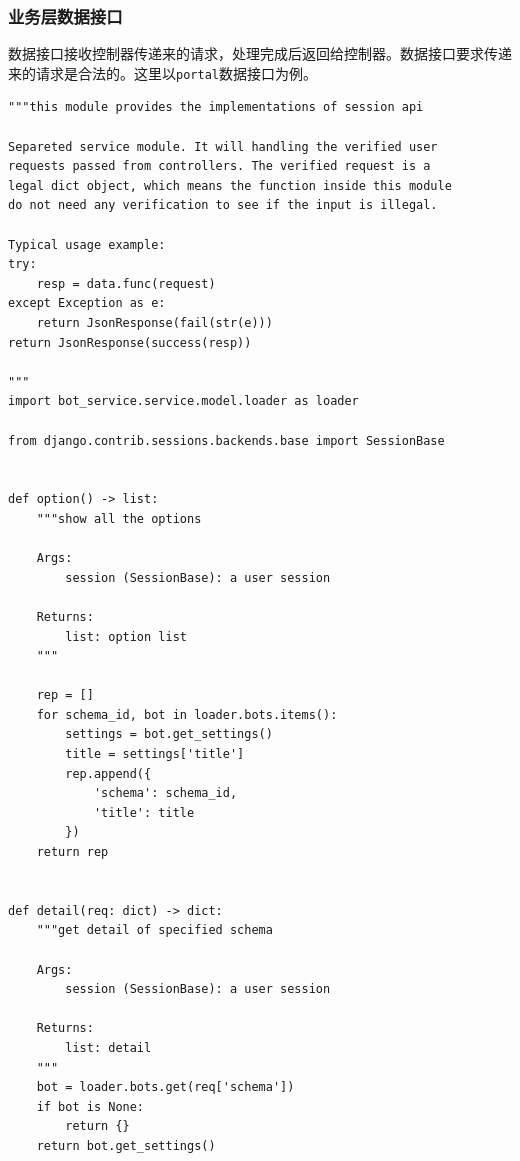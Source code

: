 \documentclass[hyperref]{ctexart}
\begin{document}
\subsubsection{业务层数据接口}
数据接口接收控制器传递来的请求，处理完成后返回给控制器。数据接口要求传递来的请求是合法的。这里以\texttt{portal}数据接口为例。
\begin{lstlisting}
"""this module provides the implementations of session api

Separeted service module. It will handling the verified user
requests passed from controllers. The verified request is a 
legal dict object, which means the function inside this module
do not need any verification to see if the input is illegal.

Typical usage example:
try:
    resp = data.func(request)
except Exception as e:
    return JsonResponse(fail(str(e)))
return JsonResponse(success(resp))

"""
import bot_service.service.model.loader as loader

from django.contrib.sessions.backends.base import SessionBase


def option() -> list:
    """show all the options

    Args:
        session (SessionBase): a user session

    Returns:
        list: option list
    """

    rep = []
    for schema_id, bot in loader.bots.items():
        settings = bot.get_settings()
        title = settings['title']
        rep.append({
            'schema': schema_id,
            'title': title
        })
    return rep


def detail(req: dict) -> dict:
    """get detail of specified schema

    Args:
        session (SessionBase): a user session

    Returns:
        list: detail
    """
    bot = loader.bots.get(req['schema'])
    if bot is None:
        return {}
    return bot.get_settings()
\end{lstlisting}
\end{document}
